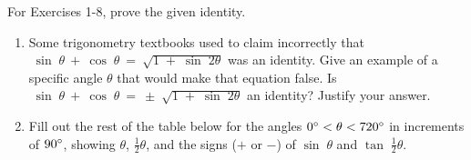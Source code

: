 \startexercises\label{sec3dot3}
\vspace{5mm}
{\small
\noindent For Exercises 1-8, prove the given identity.
\begin{enumerate}[\bfseries 1.]
 \item Some trigonometry textbooks used to claim incorrectly that
  $\;\sin\;\theta ~+~ \cos\;\theta ~=~ \sqrt{1 \;+\; \sin\;2\theta}$ was an identity. Give an example of a specific
  angle $\theta$ that would make that equation false. Is
  $\;\sin\;\theta ~+~ \cos\;\theta ~=~ \pm\;\sqrt{1 \;+\; \sin\;2\theta}$ an identity? Justify your answer.
 \item\label{exer:halftanaltpos} Fill out the rest of the table below for the angles $0^\circ < \theta
  < 720^\circ$ in increments of $90^\circ$, showing $\theta$, $\tfrac{1}{2}\theta$, and the signs ($+$
  or $-$) of $\sin\;\theta$ and $\tan\;\tfrac{1}{2}\theta$.
\begin{minipage}[t]{7.5cm}
 \begin{center}
  \begin{tabular}{@{}cccc@{}}

\end{tabular}
\end{center}
\end{minipage}
\end{enumerate}}
